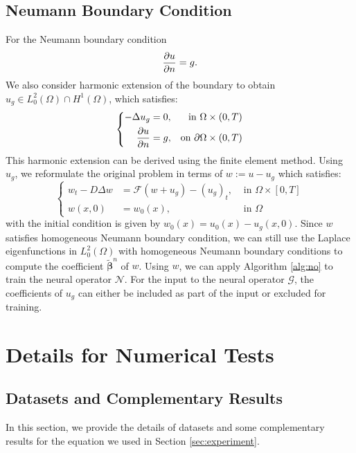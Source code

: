 \documentclass[preprint,12pt]{elsarticle}
\theoremstyle{plain}
\numberwithin{figure}{section}
\numberwithin{table}{section}
\begin{document}
\subsection{Neumann Boundary Condition}
For the Neumann boundary condition
\begin{equation}
	{\partial u\over \partial n}=g.
\end{equation}
We also consider harmonic extension of the boundary to obtain $u_g \in L^2_0(\Omega) \cap H^1(\Omega)$,  which satisfies:
\begin{equation}
	\left\{
	\begin{aligned}
		-\Delta u_g &= 0, &\text{in}~\Omega \times (0,T)\\
		{\partial u\over \partial n} &=g,&\text{on}~\partial\Omega\times(0,T)
	\end{aligned}
	\right.
\end{equation}
This harmonic extension can be derived using the finite element method. Using $u_g$, we reformulate the original problem in terms of $w:=u-u_g$ which satisfies:
\begin{equation}
	\left\{
	\begin{aligned}
		w_t-D\Delta w &= \mathcal{F}(w+u_g)-(u_g)_t, & \text{ in }\Omega\times [0,T]\\
		w(x,0) &= w_0(x), &\text{ in }\Omega
	\end{aligned}\right.
\end{equation}
with the initial condition is given by $w_0(x)=u_0(x)-u_g(x,0)$. Since $w$ satisfies homogeneous Neumann boundary condition, we can still use the Laplace eigenfunctions  in $L^2_0(\Omega)$ with homogeneous Neumann boundary conditions to compute the coefficient $\bm{\widetilde{\beta}}^n$ of $w$. Using $w$, we can apply Algorithm \ref{alg:no} to train the neural operator $\mathcal{N}$. For the input to the neural operator $\mathcal{G}$, the coefficients of $u_g$ can either be included as part of the input or excluded for training.
\section{Details for Numerical Tests}\label{appdendix:test}
\subsection{Datasets and Complementary Results}
In this section, we provide the details of datasets and some complementary results for the equation we used in Section \ref{sec:experiment}.
\end{document}
